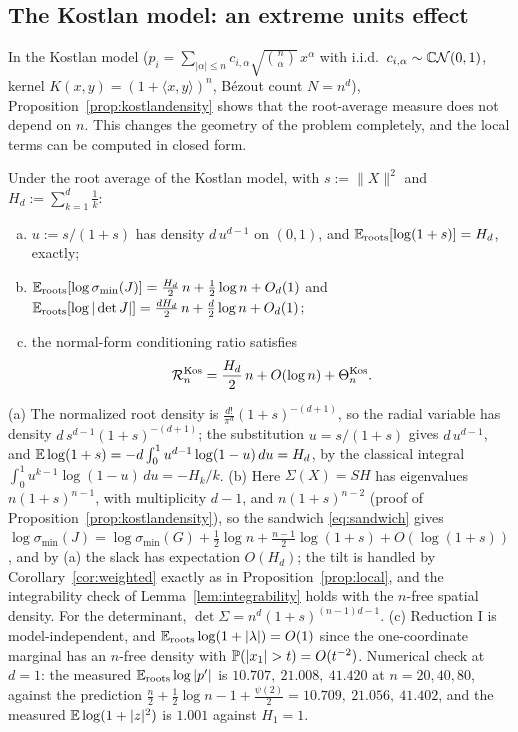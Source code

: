 \subsection{The Kostlan model: an extreme units effect}\label{sec:kostlan}

In the Kostlan model ($p_i = \sum_{|\alpha|\le n}c_{i,\alpha}\sqrt{\binom n\alpha}\,
x^\alpha$ with i.i.d.\ $c_{i,\alpha}\sim\mathbb{C}\mathcal{N}(0,1)$, kernel
$K(x,y) = (1+\langle x,y\rangle)^n$, B\'ezout count $N=n^d$),
Proposition~\ref{prop:kostlandensity} shows that the root-average measure does not depend
on $n$. This changes the geometry of the problem completely, and the local terms can be
computed in closed form.

\begin{proposition}\label{prop:kostlan}
  Under the root average of the Kostlan model, with $s:=\|X\|^2$ and
  $H_d:=\sum_{k=1}^d\frac1k$:
  \begin{enumerate}[(a)]
    \item $u := s/(1+s)$ has density $d\,u^{d-1}$ on $(0,1)$, and
      $\mathbb{E}_{\mathrm{roots}}[\log(1+s)] = H_d$, exactly;
    \item $\mathbb{E}_{\mathrm{roots}}[\log\sigma_{\min}(J)] = \frac{H_d}2\,n + \frac12\log n + O_d(1)$ and
      $\mathbb{E}_{\mathrm{roots}}[\log|\det J|] = \frac{dH_d}2\,n + \frac d2\log n + O_d(1)$;
    \item the normal-form conditioning ratio satisfies
      \[
        \mathcal{R}_n^{\mathrm{Kos}} = \frac{H_d}2\,n + O(\log n) + \Theta_n^{\mathrm{Kos}}.
      \]
  \end{enumerate}
\end{proposition}

\proof
(a) The normalized root density is $\frac{d!}{\pi^d}(1+s)^{-(d+1)}$, so the radial
variable has density $d\,s^{d-1}(1+s)^{-(d+1)}$; the substitution $u=s/(1+s)$ gives
$d\,u^{d-1}$, and
$\mathbb{E}\log(1+s) = -d\int_0^1u^{d-1}\log(1-u)\,du = H_d$, by the classical integral
$\int_0^1u^{k-1}\log(1-u)\,du = -H_k/k$. (b) Here $\Sigma(X) = SH$ has eigenvalues
$n(1+s)^{n-1}$, with multiplicity $d-1$, and $n(1+s)^{n-2}$ (proof of
Proposition~\ref{prop:kostlandensity}), so the sandwich \eqref{eq:sandwich} gives
$\log\sigma_{\min}(J) = \log\sigma_{\min}(G) + \frac12\log n
+ \frac{n-1}2\log(1+s) + O(\log(1+s))$, and by (a) the slack has expectation $O(H_d)$;
the tilt is handled by Corollary~\ref{cor:weighted} exactly as in
Proposition~\ref{prop:local}, and the integrability check of
Lemma~\ref{lem:integrability} holds with the $n$-free spatial density. For the
determinant, $\det\Sigma = n^d(1+s)^{(n-1)d-1}$. (c) Reduction I is model-independent,
and $\mathbb{E}_{\mathrm{roots}}\log(1+|\lambda|) = O(1)$ since the one-coordinate marginal has an $n$-free
density with $\P(|x_1|>t) = O(t^{-2})$. Numerical check at $d=1$: the measured
$\mathbb{E}_{\mathrm{roots}}\log|p'|$ is $10.707,\ 21.008,\ 41.420$ at $n=20,40,80$, against the prediction
$\frac n2 + \frac12\log n - 1 + \frac{\psi(2)}2 = 10.709,\ 21.056,\ 41.402$, and the
measured $\mathbb{E}\log(1+|z|^2)$ is $1.001$ against $H_1=1$.
\endproof

